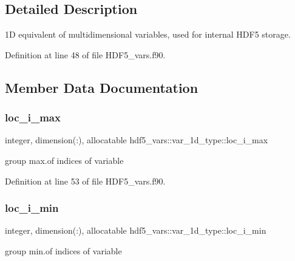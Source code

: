 \subsection{Detailed Description}
1D equivalent of multidimensional variables, used for internal H\+D\+F5 storage. 

Definition at line 48 of file H\+D\+F5\+\_\+vars.\+f90.



\subsection{Member Data Documentation}
\mbox{\label{structhdf5__vars_1_1var__1d__type_a18540fc95d6a5a271f99b26a4df0f798}} 
\subsubsection{\texorpdfstring{loc\+\_\+i\+\_\+max}{loc\_i\_max}}
{\footnotesize\ttfamily integer, dimension(\+:), allocatable hdf5\+\_\+vars\+::var\+\_\+1d\+\_\+type\+::loc\+\_\+i\+\_\+max}



group max.\+of indices of variable 



Definition at line 53 of file H\+D\+F5\+\_\+vars.\+f90.

\mbox{\label{structhdf5__vars_1_1var__1d__type_af7e9da42aee3ad9ec599261f7855c8a9}} 
\subsubsection{\texorpdfstring{loc\+\_\+i\+\_\+min}{loc\_i\_min}}
{\footnotesize\ttfamily integer, dimension(\+:), allocatable hdf5\+\_\+vars\+::var\+\_\+1d\+\_\+type\+::loc\+\_\+i\+\_\+min}



group min.\+of indices of variable 



